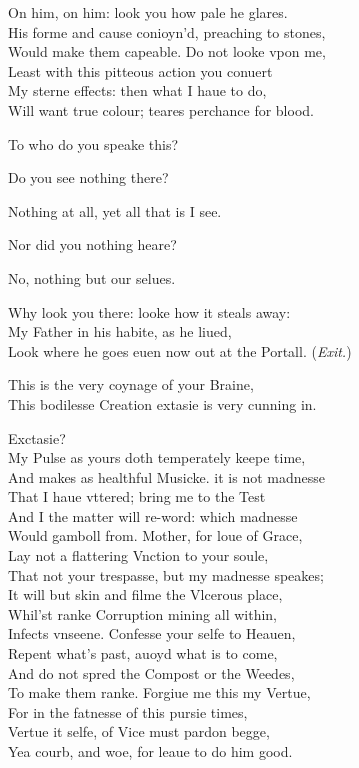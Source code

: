 \documentclass[a5paper,DIV=calc,11pt]{scrbook}
\begin{document}
\begin{drama*}
    \hamspeaks On him, on him: look you how pale he glares.\\
    His forme and cause conioyn'd, preaching to stones,\\
    Would make them capeable. Do not looke vpon me,\\
    Least with this pitteous action you conuert\\
    My sterne effects: then what I haue to do,\\
    Will want true colour; teares perchance for blood.
    
    \queenspeaks To who do you speake this?
    
    \hamspeaks Do you see nothing there?
    
    \queenspeaks Nothing at all, yet all that is I see.
    
    \hamspeaks Nor did you nothing heare?
    
    \queenspeaks No, nothing but our selues.
    
    \hamspeaks Why look you there: looke how it steals away:\\
    My Father in his habite, as he liued,\\
    Look where he goes euen now out at the Portall. \hfill(\textit{Exit.})
    
    \queenspeaks This is the very coynage of your Braine,\\
    This bodilesse Creation extasie is very cunning in.
    
    \hamspeaks Exctasie?\\
    My Pulse as yours doth temperately keepe time,\\
    And makes as healthful Musicke. it is not madnesse\\
    That I haue vttered; bring me to the Test\\
    And I the matter will re-word: which madnesse\\
    Would gamboll from. Mother, for loue of Grace,\\
    Lay not a flattering Vnction to your soule,\\
    That not your trespasse, but my madnesse speakes;\\
    It will but skin and filme the Vlcerous place,\\
    Whil'st ranke Corruption mining all within,\\
    Infects vnseene. Confesse your selfe to Heauen,\\
    Repent what's past, auoyd what is to come,\\
    And do not spred the Compost or the Weedes,\\
    To make them ranke. Forgiue me this my Vertue,\\
    For in the fatnesse of this pursie times,\\
    Vertue it selfe, of Vice must pardon begge,\\
    Yea courb, and woe, for leaue to do him good.
    

\end{drama*}
\end{document}
